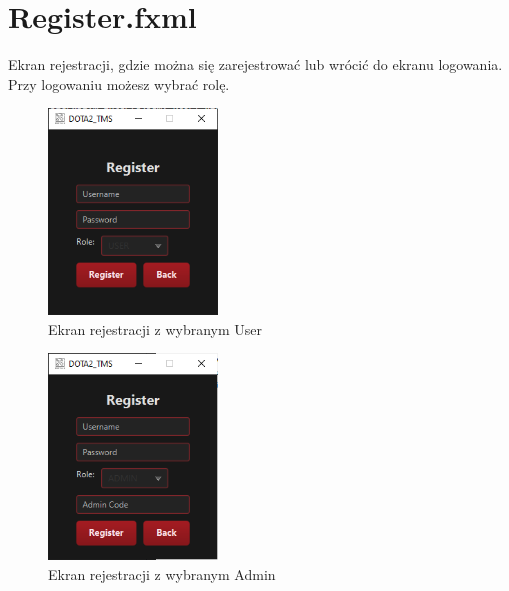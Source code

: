 \section{Register.fxml}
Ekran rejestracji, gdzie można się zarejestrować lub wrócić do ekranu logowania. Przy logowaniu możesz wybrać rolę.
\begin{figure}[H]
    \centering
    \includegraphics[width=0.4\textwidth]{figures/Register1.png}
    \caption{Ekran rejestracji z wybranym User \label{fig:register}}
\end{figure}
\begin{figure}[H]
    \centering
    \includegraphics[width=0.4\textwidth]{figures/Register2.png}
    \caption{Ekran rejestracji z wybranym Admin \label{fig:register1}}
\end{figure}
